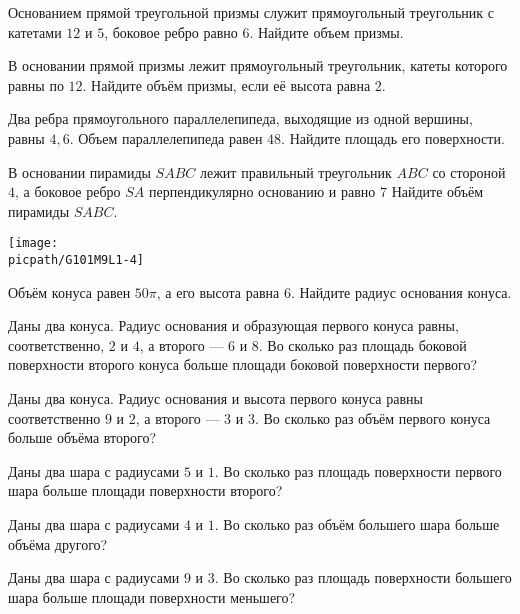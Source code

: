 \begin{homework}[number=1]
	\begin{listofex}
		
		\item Основанием прямой треугольной призмы служит прямоугольный треугольник с катетами \(12\) и \(5\), боковое ребро равно \(6\). Найдите объем призмы.
		\item В основании прямой призмы лежит прямоугольный треугольник, катеты которого равны по \(12\). Найдите объём призмы, если её высота равна \(2\).
		\item Два ребра прямоугольного параллелепипеда, выходящие из одной вершины, равны \(4, 6\). Объем параллелепипеда равен \(48\). Найдите площадь его поверхности.
		\item 
		\begin{minipage}[t]{\bodywidth}
			В основании пирамиды \(SABC\) лежит правильный треугольник \(ABC\) со стороной \(4\), а боковое ребро \(SA\) перпендикулярно основанию и равно \(7\) Найдите объём пирамиды \(SABC\).
		\end{minipage}
		\hspace{0.02\linewidth}
		\begin{minipage}[t]{\picwidth}
			\texttt{[image: \\picpath/G101M9L1-4]}
		\end{minipage}
		\item Объём конуса равен \(50\pi \), а его высота равна \(6\). Найдите радиус основания конуса.
		\item Даны два конуса. Радиус основания и образующая первого конуса равны, соответственно, \(2\) и \(4\), а второго --- \(6\) и \(8\). Во сколько раз площадь боковой поверхности второго конуса больше площади боковой поверхности первого?
		\item Даны два конуса. Радиус основания и высота первого конуса равны соответственно \(9\) и \(2\), а второго --- \(3\) и \(3\). Во сколько раз объём первого конуса больше объёма второго?
		\item Даны два шара с радиусами \(5\) и \(1\). Во сколько раз площадь поверхности первого шара больше площади поверхности второго?
		\item Даны два шара с радиусами \(4\) и \(1\). Во сколько раз объём большего шара больше объёма другого?
		\item Даны два шара с радиусами \(9\) и \(3\). Во сколько раз площадь поверхности большего шара больше площади поверхности меньшего?
	\end{listofex}
\end{homework}

